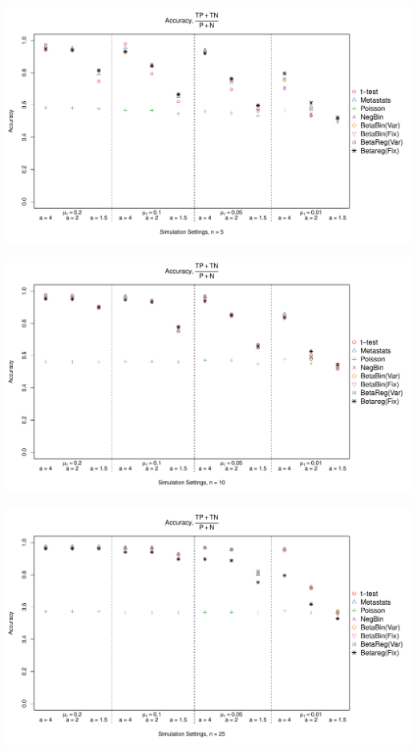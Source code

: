 \documentclass[12pt]{article}\usepackage{graphicx, color}
\makeatletter
\def\maxwidth{ %
  \ifdim\Gin@nat@width>\linewidth
    \linewidth
  \else
    \Gin@nat@width
  \fi
}
\newenvironment{knitrout}{}{} %
\makeatother
\begin{document}
\begin{knitrout}
{}




{\centering \includegraphics[width=\maxwidth]{figure/panelPlots10} 

}




{\centering \includegraphics[width=\maxwidth]{figure/panelPlots11} 

}




{\centering \includegraphics[width=\maxwidth]{figure/panelPlots12} 

}



\end{knitrout}
\end{document}
